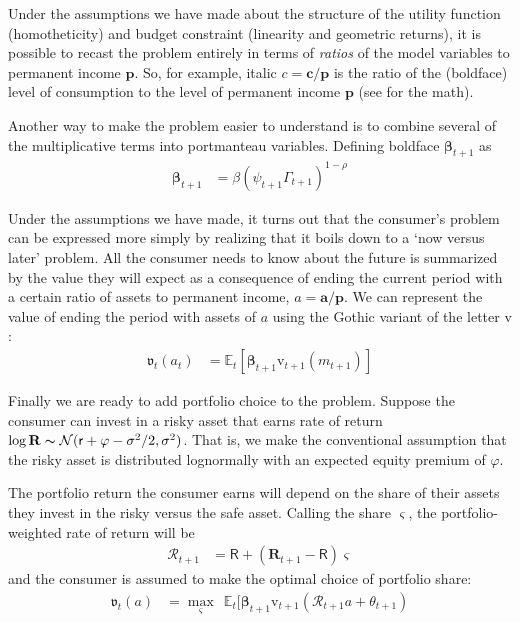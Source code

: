 \documentclass{article}
\newcommand{\CRRA}{\rho}
\newcommand{\pLvl}{\mathbf{p}}
\newcommand{\DiscFac}{\beta}
\newcommand{\vFunc}{\mathrm{v}}
\newcommand{\Alive}{\mathcal{L}}
\newcommand{\cLvl}{\mathbf{c}}
\newcommand{\Ex}{\mathbb{E}}
\newcommand{\permGroFac}{\Gamma}
\newcommand{\permShk}{\psi}
\newcommand{\cNrm}{c}
\newcommand{\Rfree}{\mathsf{R}}
\newcommand{\RNrm}{\mathcal{R}}
\newcommand{\aLvl}{\mathbf{a}}
\newcommand{\aNrm}{a}
\newcommand{\mNrm}{m}
\newcommand{\rfree}{\mathsf{r}}
\newcommand{\eprem}{\varphi}
\newcommand{\Risky}{\mathbf{R}}
\newcommand{\Rport}{\mathcal{R}}
\begin{document}
Under the assumptions we have made about the structure of the utility function (homotheticity) and budget constraint (linearity and geometric returns), it is possible to recast the problem entirely in terms of \textit{ratios} of the model variables to permanent income $\pLvl$. So, for example, italic $\cNrm = \cLvl/\pLvl$ is the ratio of the (boldface) level of consumption to the level of permanent income $\pLvl$ (see \cite{BufferStockTheory} for the math).

Another way to make the problem easier to understand is to combine several of the multiplicative terms into portmanteau variables. Defining boldface $\pmb{\DiscFac}_{t+1}$ as
\begin{align}
     \pmb{\DiscFac}_{t+1} & ={\beta} (\permShk_{t+1} \permGroFac_{t+1})^{1-\CRRA}
\end{align}


Under the assumptions we have made, it turns out that the consumer's problem can be expressed more simply by realizing that it boils down to a `now versus later' problem.  All the consumer needs to know about the future is summarized by the value they will expect as a consequence of ending the current period with a certain ratio of assets to permanent income, $\aNrm = \aLvl/\pLvl$. We can represent the value of ending the period with assets of $\aNrm$ using the Gothic variant of the letter $\vFunc$:
\begin{align}
    \mathfrak{v}_{t}(\aNrm_{t}) & = \Ex_{t}[\pmb{\DiscFac}_{t+1}\vFunc_{t+1}(\mNrm_{t+1})]
\end{align}

Finally we are ready to add portfolio choice to the problem. Suppose the consumer can invest in a risky asset that earns rate of return $\log \Risky \thicksim \mathcal{N}(\rfree + \eprem - \sigma^{2}/2, \sigma^{2})$. That is, we make the conventional assumption that the risky asset is distributed lognormally with an expected equity premium of $\eprem$.

The portfolio return the consumer earns will depend on the share of their assets they invest in the risky versus the safe asset. Calling the share $\varsigma$, the portfolio-weighted rate of return will be
\begin{align}
    \Rport_{t+1} & = \Rfree + (\Risky_{t+1}-\Rfree)\varsigma
\end{align}
and the consumer is assumed to make the optimal choice of portfolio share:
\begin{align}
\mathfrak{v}_{t}(a) & = \max_{\varsigma}~~ \Ex_{t}[\pmb{\beta}_{t+1} \vFunc_{t+1}(\Rport_{t+1} a + \theta_{t+1})
\end{align}
\end{document}
